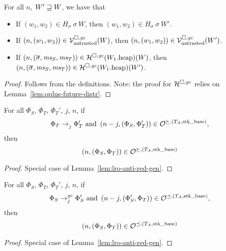 \begin{lemma}
  \label{lem:monotonicity}
  For all $n$, $W' \future W$, we have that
  \begin{itemize}
  \item If $(w_1,w_2) \in H_\sigma~\sigma~W$, then $(w_1,w_2) \in H_\sigma~\sigma~W'$.
  \item If $\npair{(w_1,w_2)} \in \lrv(W)$, then $\npair{(w_1,w_2)} \in
    \lrv(W')$.
  \item If $\npair{(\overline{\sigma},\ms_S,\ms_T)} \in \lrheap(\pwheap[W_1])(W)$, then $\npair{(\overline{\sigma},\ms_S,\ms_T)} \in
    \lrheap(\pwheap[W_1])(W')$.
\end{itemize}
\end{lemma}
\begin{proof}
  Follows from the definitions.
  Note: the proof for $\lrheap$ relies on Lemma~\ref{lem:oplus-future-distr}.
\end{proof}

\begin{lemma}
  For all $\Phi_S$, $\Phi_T$, $\Phi_T'$, $j$, $n$, if
\[
  \Phi_T \nstep[j]{} \Phi_T' \text{ and } \npair[n-j]{(\Phi_S,\Phi_T')} \in \lror,
\]
then
\[
  \npair{(\Phi_S,\Phi_T)} \in \lror
\]
\end{lemma}
\begin{proof}
  Special case of Lemma~\ref{lem:lro-anti-red-gen}.
\end{proof}

\begin{lemma}
  For all $\Phi_S$, $\Phi_T$, $\Phi_T'$, $j$, $n$, if
\[
  \Phi_S \nstep[j]{\gc} \Phi_S' \text{ and } \npair[n-j]{(\Phi_S',\Phi_T)} \in \lrol,
\]
then
\[
  \npair{(\Phi_S,\Phi_T)} \in \lrol
\]
\end{lemma}
\begin{proof}
  Special case of Lemma~\ref{lem:lro-anti-red-gen}.
\end{proof}


